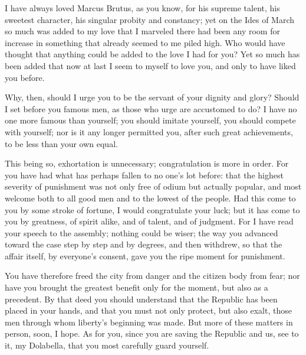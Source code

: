  I have always loved Marcus Brutus, as you know, for his supreme talent, his sweetest character, his singular probity and constancy; yet on the Ides of March so much was added to my love that I marveled there had been any room for increase in something that already seemed to me piled high. Who would have thought that anything could be added to the love I had for you? Yet so much has been added that now at last I seem to myself to love you, and only to have liked you before.

 Why, then, should I urge you to be the servant of your dignity and glory? Should I set before you famous men, as those who urge are accustomed to do? I have no one more famous than yourself; you should imitate yourself, you should compete with yourself; nor is it any longer permitted you, after such great achievements, to be less than your own equal.

 This being so, exhortation is unnecessary; congratulation is more in order. For you have had what has perhaps fallen to no one's lot before: that the highest severity of punishment was not only free of odium but actually popular, and most welcome both to all good men and to the lowest of the people. Had this come to you by some stroke of fortune, I would congratulate your luck; but it has come to you by greatness, of spirit alike, and of talent, and of judgment. For I have read your speech to the assembly; nothing could be wiser; the way you advanced toward the case step by step and by degrees, and then withdrew, so that the affair itself, by everyone's consent, gave you the ripe moment for punishment.

 You have therefore freed the city from danger and the citizen body from fear; nor have you brought the greatest benefit only for the moment, but also as a precedent. By that deed you should understand that the Republic has been placed in your hands, and that you must not only protect, but also exalt, those men through whom liberty's beginning was made. But more of these matters in person, soon, I hope. As for you, since you are saving the Republic and us, see to it, my Dolabella, that you most carefully guard yourself.
